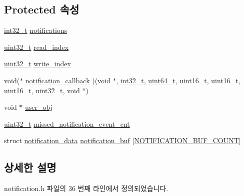 \subsection*{Protected 속성}
\begin{DoxyCompactItemize}
\item 
\hyperlink{parse_8c_a37994e3b11c72957c6f454c6ec96d43d}{int32\+\_\+t} \hyperlink{classavdecc__lib_1_1notification_a02a497f6526df74aec4060942683da34}{notifications}
\item 
\hyperlink{parse_8c_a6eb1e68cc391dd753bc8ce896dbb8315}{uint32\+\_\+t} \hyperlink{classavdecc__lib_1_1notification_a2ccf0f8cb3b20ac18cc9c7bcff1084ad}{read\+\_\+index}
\item 
\hyperlink{parse_8c_a6eb1e68cc391dd753bc8ce896dbb8315}{uint32\+\_\+t} \hyperlink{classavdecc__lib_1_1notification_a44d246646acf5f95a78a87d606f22a42}{write\+\_\+index}
\item 
void($\ast$ \hyperlink{classavdecc__lib_1_1notification_a0aaf6a2e3f6d6e3fb6b416e9c2f7f6e9}{notification\+\_\+callback} )(void $\ast$, \hyperlink{parse_8c_a37994e3b11c72957c6f454c6ec96d43d}{int32\+\_\+t}, \hyperlink{parse_8c_aec6fcb673ff035718c238c8c9d544c47}{uint64\+\_\+t}, uint16\+\_\+t, uint16\+\_\+t, uint16\+\_\+t, \hyperlink{parse_8c_a6eb1e68cc391dd753bc8ce896dbb8315}{uint32\+\_\+t}, void $\ast$)
\item 
void $\ast$ \hyperlink{classavdecc__lib_1_1notification_af3646c45b560aeab38e708886dec0d93}{user\+\_\+obj}
\item 
\hyperlink{parse_8c_a6eb1e68cc391dd753bc8ce896dbb8315}{uint32\+\_\+t} \hyperlink{classavdecc__lib_1_1notification_a55b9ebbf69af44fa3923a8da478f9b27}{missed\+\_\+notification\+\_\+event\+\_\+cnt}
\item 
struct \hyperlink{structavdecc__lib_1_1notification_1_1notification__data}{notification\+\_\+data} \hyperlink{classavdecc__lib_1_1notification_a87642905af524dd0472d4646f3cea881}{notification\+\_\+buf} \mbox{[}\hyperlink{classavdecc__lib_1_1notification_abc6126af1d45847bc59afa0aa3216b04ada38b9a5f8c87a3601acb7600b015401}{N\+O\+T\+I\+F\+I\+C\+A\+T\+I\+O\+N\+\_\+\+B\+U\+F\+\_\+\+C\+O\+U\+NT}\mbox{]}
\end{DoxyCompactItemize}


\subsection{상세한 설명}


notification.\+h 파일의 36 번째 라인에서 정의되었습니다.



